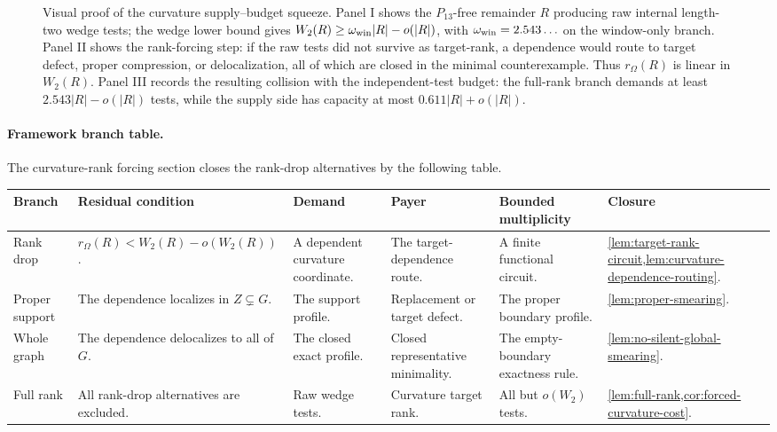 \documentclass[11pt]{article}
\newcommand{\FrameworkBranchTableHeader}{%
\toprule
\textbf{Branch} & \textbf{Residual condition} & \textbf{Demand} & \textbf{Payer} & \textbf{Bounded multiplicity} & \textbf{Closure}\\
\midrule
}
\begin{document}
\begin{figure}[t]
{%
}
\caption[Visual proof of the curvature supply--budget squeeze]{Visual proof of the curvature supply--budget squeeze.  Panel I shows the \(P_{13}\)-free remainder \(R\) producing raw internal length-two wedge tests; the wedge lower bound gives \(W_2(R)\ge\omega_{\rm win}|R|-o(|R|)\), with \(\omega_{\rm win}=2.543\ldots\) on the window-only branch.  Panel II shows the rank-forcing step: if the raw tests did not survive as target-rank, a dependence would route to target defect, proper compression, or delocalization, all of which are closed in the minimal counterexample.  Thus \(r_\Omega(R)\) is linear in \(W_2(R)\).  Panel III records the resulting collision with the independent-test budget: the full-rank branch demands at least \(2.543|R|-o(|R|)\) tests, while the supply side has capacity at most \(0.611|R|+o(|R|)\).}
\label{fig:curvature-budget-squeeze}
\end{figure}

\paragraph{Framework branch table.}
The curvature-rank forcing section closes the rank-drop alternatives by the
following table.
\begin{longtable}{L{0.13\textwidth} L{0.19\textwidth} L{0.14\textwidth} L{0.14\textwidth} L{0.17\textwidth} L{0.17\textwidth}}
\FrameworkBranchTableHeader
Rank drop
&
\(r_\Omega(R)<W_2(R)-o(W_2(R))\).
&
A dependent curvature coordinate.
&
The target-dependence route.
&
A finite functional circuit.
&
\cref{lem:target-rank-circuit,lem:curvature-dependence-routing}.
\\
\addlinespace
Proper support
&
The dependence localizes in \(Z\subsetneq G\).
&
The support profile.
&
Replacement or target defect.
&
The proper boundary profile.
&
\cref{lem:proper-smearing}.
\\
\addlinespace
Whole graph
&
The dependence delocalizes to all of \(G\).
&
The closed exact profile.
&
Closed representative minimality.
&
The empty-boundary exactness rule.
&
\cref{lem:no-silent-global-smearing}.
\\
\addlinespace
Full rank
&
All rank-drop alternatives are excluded.
&
Raw wedge tests.
&
Curvature target rank.
&
All but \(o(W_2)\) tests.
&
\cref{lem:full-rank,cor:forced-curvature-cost}.
\\
\bottomrule
\end{longtable}
\end{document}
